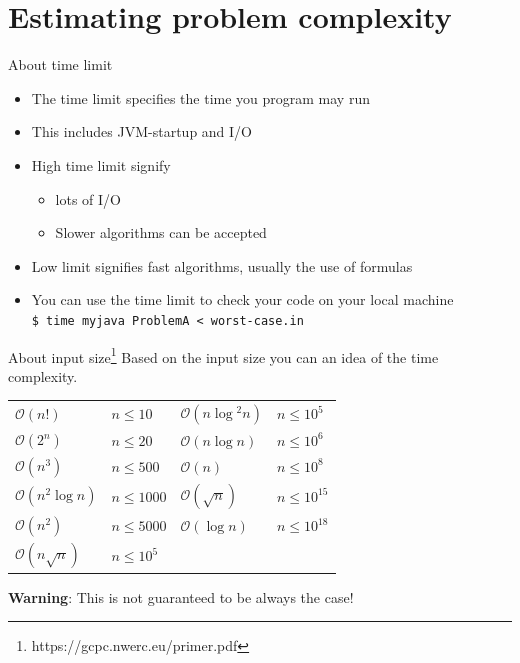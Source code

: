 \documentclass[11pt,pdf, aspectratio=169]{beamer}
\begin{document}
  \section{Estimating problem complexity}
  \begin{frame}{About time limit}
    \begin{itemize}
      \item The time limit specifies the time you program may run
      \item This includes JVM-startup and I/O
      \item High time limit signify \begin{itemize}
                                      \item lots of I/O
                                      \item Slower algorithms can be accepted
      \end{itemize}
      \item Low limit signifies fast algorithms, usually the use of formulas
      \item You can use the time limit to check your code on your local machine\\
        \texttt{\$ time myjava ProblemA < worst-case.in}
    \end{itemize}
  \end{frame}
  \begin{frame}{About input size\footnote[1]{https://gcpc.nwerc.eu/primer.pdf}}
    Based on the input size you can an idea of the time complexity.

    \begin{center}
      \begin{tabular}{llll}
        \hline
        $\mathcal{O}(n!)$         & $n \leq 10$   & $\mathcal{O}(n\log{}^{2}n)$ & $n \leq 10^5$    \\
        $\mathcal{O}(2^n)$        & $n \leq 20$   & $\mathcal{O}(n\log{}n)$     & $n \leq 10^6$    \\
        $\mathcal{O}(n^3)$        & $n \leq 500$  & $\mathcal{O}(n)$            & $n \leq 10^8$    \\
        $\mathcal{O}(n^2\log{}n)$ & $n \leq 1000$ & $\mathcal{O}(\sqrt{n})$     & $n \leq 10^{15}$ \\
        $\mathcal{O}(n^2)$        & $n \leq 5000$ & $\mathcal{O}(\log{}n)$      & $n \leq 10^{18}$ \\
        $\mathcal{O}(n\sqrt {n})$ & $n \leq 10^5$ &                             &                  \\
        \hline
      \end{tabular}
    \end{center}

    \textbf{Warning}: This is not guaranteed to be always the case!
  \end{frame}
\end{document}
